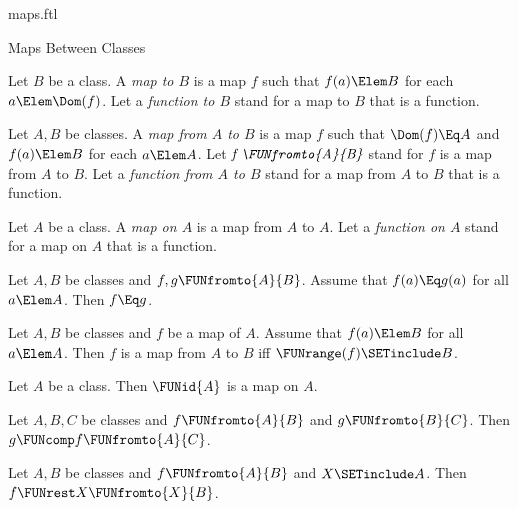 \documentclass{stex}
\begin{document}
\begin{smodule}{maps.ftl}
\begin{sfragment}{Maps Between Classes}
  \begin{definition}[forthel]
    Let $B$ be a class.
    A \emph{map to $B$} is a map $f$ such that $f(a) \Elem B$ for each $a \Elem \Dom(f)$.
    Let a \emph{function to $B$} stand for a map to $B$ that is a function.
  \end{definition}

  \begin{definition}[forthel]
    Let $A, B$ be classes.
    A \emph{map from $A$ to $B$} is a map $f$ such that $\Dom(f) \Eq A$ and $f(a) \Elem B$ for each $a \Elem A$.
    Let $\emph{f \FUNfromto{A}{B}}$ stand for $f$ is a map from $A$ to $B$.
    Let a \emph{function from $A$ to $B$} stand for a map from $A$ to $B$ that is a function.
  \end{definition}

  \begin{definition}[forthel]
    Let $A$ be a class.
    A \emph{map on $A$} is a map from $A$ to $A$.
    Let a \emph{function on $A$} stand for a map on $A$ that is a function.
  \end{definition}

  \begin{proposition}[forthel]
    Let $A, B$ be classes and $f, g \FUNfromto{A}{B}$.
    Assume that $f(a) \Eq g(a)$ for all $a \Elem A$.
    Then $f \Eq g$.
  \end{proposition}

  \begin{proposition}
    Let $A, B$ be classes and $f$ be a map of $A$.
    Assume that $f(a) \Elem B$ for all $a \Elem A$.
    Then $f$ is a map from $A$ to $B$ iff $\FUNrange(f) \SETinclude B$.
  \end{proposition}

  \begin{proposition}[forthel]
    Let $A$ be a class.
    Then $\FUNid{A}$ is a map on $A$.
  \end{proposition}

  \begin{proposition}[forthel]
    Let $A, B, C$ be classes and $f \FUNfromto{A}{B}$ and $g \FUNfromto{B}{C}$.
    Then $g \FUNcomp f \FUNfromto{A}{C}$.
  \end{proposition}

  \begin{proposition}[forthel]
    Let $A, B$ be classes and $f \FUNfromto{A}{B}$ and $X \SETinclude A$.
    Then $f \FUNrest X \FUNfromto{X}{B}$.
  \end{proposition}


\end{sfragment}
\end{smodule}
\end{document}
